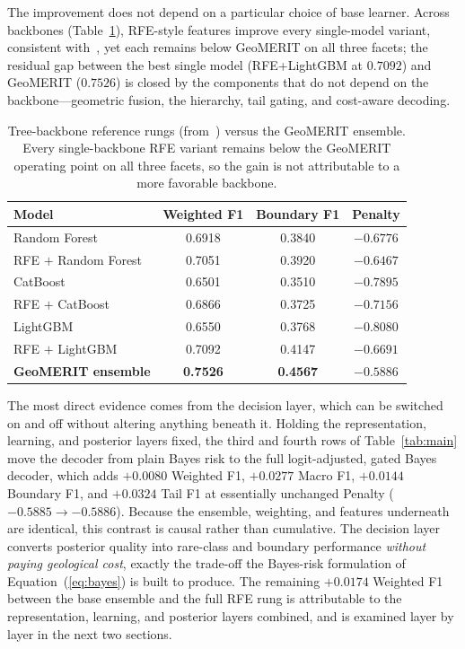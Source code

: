 \documentclass[bdcc,article,submit,pdftex,moreauthors]{Definitions/mdpi}
\begin{document}
The improvement does not depend on a particular choice of base learner. Across backbones
(Table~\ref{tab:backbones}), RFE-style features improve every single-model variant, consistent
with~\cite{chen2026rfe}, yet each remains below GeoMERIT on all three facets; the residual gap
between the best single model (RFE+LightGBM at $0.7092$) and GeoMERIT ($0.7526$) is closed by
the components that do not depend on the backbone---geometric fusion, the hierarchy, tail
gating, and cost-aware decoding.

\begin{table}[H]
\caption{Tree-backbone reference rungs (from~\cite{chen2026rfe}) versus the GeoMERIT
ensemble. Every single-backbone RFE variant remains below the GeoMERIT operating point on
all three facets, so the gain is not attributable to a more favorable backbone.\label{tab:backbones}}
\begin{tabularx}{\textwidth}{Xccc}
\toprule
\textbf{Model} & \textbf{Weighted F1} & \textbf{Boundary F1} & \textbf{Penalty}\\
\midrule
Random Forest & 0.6918 & 0.3840 & $-0.6776$\\
RFE $+$ Random Forest & 0.7051 & 0.3920 & $-0.6467$\\
CatBoost & 0.6501 & 0.3510 & $-0.7895$\\
RFE $+$ CatBoost & 0.6866 & 0.3725 & $-0.7156$\\
LightGBM & 0.6550 & 0.3768 & $-0.8080$\\
RFE $+$ LightGBM & 0.7092 & 0.4147 & $-0.6691$\\
\textbf{GeoMERIT ensemble} & \textbf{0.7526} & \textbf{0.4567} & $\mathbf{-0.5886}$\\
\bottomrule
\end{tabularx}
\end{table}

The most direct evidence comes from the decision layer, which can be switched on and off without
altering anything beneath it. Holding the representation, learning, and posterior layers
fixed, the third and fourth rows of Table~\ref{tab:main} move the decoder from plain Bayes risk
to the full logit-adjusted, gated Bayes decoder, which adds $+0.0080$ Weighted F1, $+0.0277$
Macro F1, $+0.0144$ Boundary F1, and $+0.0324$ Tail F1 at essentially unchanged Penalty
($-0.5885\to-0.5886$). Because the ensemble, weighting, and features underneath are identical,
this contrast is causal rather than cumulative. The decision layer converts posterior quality
into rare-class and boundary performance \emph{without paying geological cost}, exactly the
trade-off the Bayes-risk formulation of Equation~(\ref{eq:bayes}) is built to produce. The
remaining $+0.0174$ Weighted F1 between the base ensemble and the full RFE rung is attributable
to the representation, learning, and posterior layers combined, and is examined layer by layer
in the next two sections.
\end{document}
